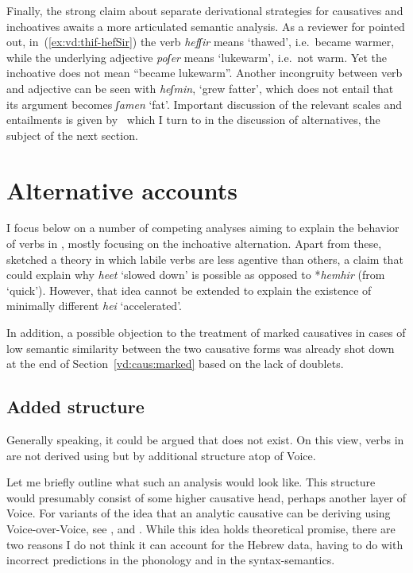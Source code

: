 Finally, the strong claim about separate derivational strategies for causatives and inchoatives awaits a more articulated semantic analysis. As a reviewer for \cite{kastner18tlr} pointed out, in~(\ref{ex:vd:thif-hefSir}) the verb \emph{hefʃir} means `thawed', i.e.~became warmer, while the underlying adjective \emph{poʃer} means `lukewarm', i.e.~not warm. Yet the inchoative does not mean ``became lukewarm''. Another incongruity between verb and adjective can be seen with \emph{heʃmin}, `grew fatter', which does not entail that its argument becomes \emph{ʃamen} `fat'. Important discussion of the relevant scales and entailments is given by~\cite{borer91} which I turn to in the discussion of alternatives, the subject of the next section.

\section{Alternative accounts} \label{vd:others}
I focus below on a number of competing analyses aiming to explain the behavior of verbs in {\thif}, mostly focusing on the inchoative alternation. Apart from these, \cite{lev16} sketched a theory in which labile verbs are less agentive than others, a claim that could explain why \emph{heet} `slowed down' is possible as opposed to *\emph{hemhir} (from `quick'). However, that idea cannot be extended to explain the existence of minimally different \emph{hei{\texttslig}} `accelerated'. 

In addition, a possible objection to the treatment of marked causatives in cases of low semantic similarity between the two causative forms was already shot down at the end of Section~\ref{vd:caus:marked} based on the lack of doublets.
	
	\subsection{Added structure} \label{vd:others:struct}
Generally speaking, it could be argued that {\vd} does not exist. On this view, verbs in {\thif} are not derived using {\vd} but by additional structure atop of Voice.

Let me briefly outline what such an analysis would look like. This structure would presumably consist of some higher causative head, perhaps another layer of Voice. For variants of the idea that an analytic causative can be deriving using Voice-over-Voice, see \cite{tubinoblanco11} ,\cite{harley13lingua,harley17oup} and \cite{nie17}. While this idea holds theoretical promise, there are two reasons I do not think it can account for the Hebrew data, having to do with incorrect predictions in the phonology and in the syntax-semantics.

